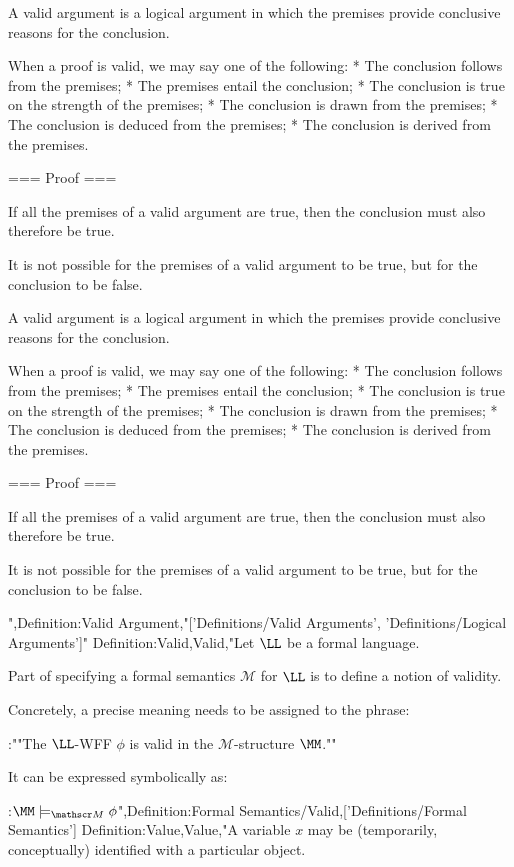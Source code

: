 A valid argument is a logical argument in which the premises provide conclusive reasons for the conclusion.


When a proof is valid, we may say one of the following:
* The conclusion follows from the premises;
* The premises entail the conclusion;
* The conclusion is true on the strength of the premises;
* The conclusion is drawn from the premises;
* The conclusion is deduced from the premises;
* The conclusion is derived from the premises.


=== Proof ===

If all the premises of a valid argument are true, then the conclusion must also therefore be true.

It is not possible for the premises of a valid argument to be true, but for the conclusion to be false.


A valid argument is a logical argument in which the premises provide conclusive reasons for the conclusion.


When a proof is valid, we may say one of the following:
* The conclusion follows from the premises;
* The premises entail the conclusion;
* The conclusion is true on the strength of the premises;
* The conclusion is drawn from the premises;
* The conclusion is deduced from the premises;
* The conclusion is derived from the premises.


=== Proof ===

If all the premises of a valid argument are true, then the conclusion must also therefore be true.

It is not possible for the premises of a valid argument to be true, but for the conclusion to be false.


",Definition:Valid Argument,"['Definitions/Valid Arguments', 'Definitions/Logical Arguments']"
Definition:Valid,Valid,"Let $\LL$ be a formal language.

Part of specifying a formal semantics $\mathscr M$ for $\LL$ is to define a notion of validity.


Concretely, a precise meaning needs to be assigned to the phrase:

:""The $\LL$-WFF $\phi$ is valid in the $\mathscr M$-structure $\MM$.""

It can be expressed symbolically as:

:$\MM \models_{\mathscr M} \phi$",Definition:Formal Semantics/Valid,['Definitions/Formal Semantics']
Definition:Value,Value,"A variable $x$ may be (temporarily, conceptually) identified with a particular object.

